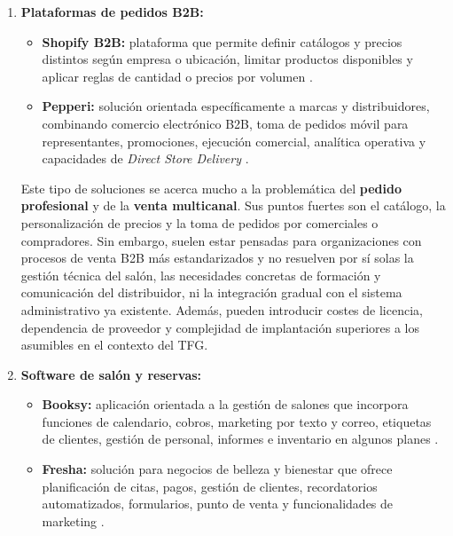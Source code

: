\begin{enumerate}[label=\textbf{\arabic*.}, leftmargin=1.1cm, itemsep=0.6em, topsep=0.35em]
  Estas herramientas cubren procesos empresariales de forma más completa que una hoja de cálculo, pero su adopción implica adaptar el negocio a un producto existente y, en algunos casos, configurar flujos que exceden el alcance real del distribuidor. Además, el proyecto desarrollado no pretende convertirse en un \textit{ERP} generalista ni sustituir la facturación oficial, sino proporcionar una capa operativa propia para usuarios internos y clientes profesionales, dejando la integración completa con Factusol como una evolución posterior.

  \item \textbf{Plataformas de pedidos B2B:}
  \begin{itemize}[topsep=0.1em, itemsep=0.15em]
    \item \textbf{Shopify B2B:} plataforma que permite definir catálogos y precios distintos según empresa o ubicación, limitar productos disponibles y aplicar reglas de cantidad o precios por volumen \citep{shopify-b2b-catalogs}.
    \item \textbf{Pepperi:} solución orientada específicamente a marcas y distribuidores, combinando comercio electrónico B2B, toma de pedidos móvil para representantes, promociones, ejecución comercial, analítica operativa y capacidades de \textit{Direct Store Delivery} \citep{pepperi-platform}.
  \end{itemize}

  Este tipo de soluciones se acerca mucho a la problemática del \textbf{pedido profesional} y de la \textbf{venta multicanal}. Sus puntos fuertes son el catálogo, la personalización de precios y la toma de pedidos por comerciales o compradores. Sin embargo, suelen estar pensadas para organizaciones con procesos de venta B2B más estandarizados y no resuelven por sí solas la gestión técnica del salón, las necesidades concretas de formación y comunicación del distribuidor, ni la integración gradual con el sistema administrativo ya existente. Además, pueden introducir costes de licencia, dependencia de proveedor y complejidad de implantación superiores a los asumibles en el contexto del TFG.

  \item \textbf{Software de salón y reservas:}
  \begin{itemize}[topsep=0.1em, itemsep=0.15em]
    \item \textbf{Booksy:} aplicación orientada a la gestión de salones que incorpora funciones de calendario, cobros, marketing por texto y correo, etiquetas de clientes, gestión de personal, informes e inventario en algunos planes \citep{booksy}.
    \item \textbf{Fresha:} solución para negocios de belleza y bienestar que ofrece planificación de citas, pagos, gestión de clientes, recordatorios automatizados, formularios, punto de venta y funcionalidades de marketing \citep{fresha-features}.
  \end{itemize}


\end{enumerate}
